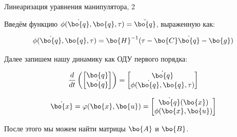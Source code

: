 \documentclass{beamer}
\begin{document}
\begin{frame}{Линеаризация уравнения манипулятора, 2}
	\begin{flushleft}
		
		Введём функцию $\phi(\dot{\bo{q}}, \bo{q}, \tau) = \ddot{\bo{q}}$, выраженную как:
		
		\begin{equation}
			\phi(\dot{\bo{q}}, \bo{q}, \tau) 
			=
			\bo{H}^{-1} (\tau - \bo{C} \dot{\bo{q}} - \bo{g} ) 
		\end{equation}
		
		Далее запишем нашу динамику как ОДУ первого порядка:
		
		\begin{equation}
			\frac{d}{dt} 
			\left(
			\begin{bmatrix}
				\bo{q} \\ \dot{\bo{q}} 
			\end{bmatrix}
			\right)
			=
			\begin{bmatrix}
				\dot{\bo{q}}  \\ 
				\phi(\dot{\bo{q}}, \bo{q}, \tau) 
			\end{bmatrix}
		\end{equation}
		
		\begin{equation}
			\dot{\bo{x}} 
			=
			\varphi(\bo{x}, \bo{u})
			=
			\begin{bmatrix}
				\dot{\bo{q}}(\bo{x})  \\ 
				\phi(\bo{x}, \bo{u}) 
			\end{bmatrix}
		\end{equation}
		
		После этого мы можем найти матрицы $\bo{A}$ и $\bo{B}$.
		
	\end{flushleft}
\end{frame}
\end{document}
